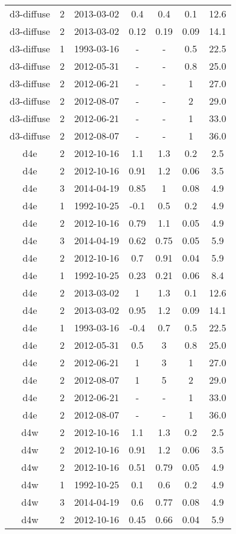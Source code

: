 \begin{longtable}{ccccccc}
d3-diffuse & 2 & 2013-03-02 & 0.4 & 0.4 & 0.1 & 12.6 \\
d3-diffuse & 2 & 2013-03-02 & 0.12 & 0.19 & 0.09 & 14.1 \\
d3-diffuse & 1 & 1993-03-16 & - & - & 0.5 & 22.5 \\
d3-diffuse & 2 & 2012-05-31 & - & - & 0.8 & 25.0 \\
d3-diffuse & 2 & 2012-06-21 & - & - & 1 & 27.0 \\
d3-diffuse & 2 & 2012-08-07 & - & - & 2 & 29.0 \\
d3-diffuse & 2 & 2012-06-21 & - & - & 1 & 33.0 \\
d3-diffuse & 2 & 2012-08-07 & - & - & 1 & 36.0 \\
d4e & 2 & 2012-10-16 & 1.1 & 1.3 & 0.2 & 2.5 \\
d4e & 2 & 2012-10-16 & 0.91 & 1.2 & 0.06 & 3.5 \\
d4e & 3 & 2014-04-19 & 0.85 & 1 & 0.08 & 4.9 \\
d4e & 1 & 1992-10-25 & -0.1 & 0.5 & 0.2 & 4.9 \\
d4e & 2 & 2012-10-16 & 0.79 & 1.1 & 0.05 & 4.9 \\
d4e & 3 & 2014-04-19 & 0.62 & 0.75 & 0.05 & 5.9 \\
d4e & 2 & 2012-10-16 & 0.7 & 0.91 & 0.04 & 5.9 \\
d4e & 1 & 1992-10-25 & 0.23 & 0.21 & 0.06 & 8.4 \\
d4e & 2 & 2013-03-02 & 1 & 1.3 & 0.1 & 12.6 \\
d4e & 2 & 2013-03-02 & 0.95 & 1.2 & 0.09 & 14.1 \\
d4e & 1 & 1993-03-16 & -0.4 & 0.7 & 0.5 & 22.5 \\
d4e & 2 & 2012-05-31 & 0.5 & 3 & 0.8 & 25.0 \\
d4e & 2 & 2012-06-21 & 1 & 3 & 1 & 27.0 \\
d4e & 2 & 2012-08-07 & 1 & 5 & 2 & 29.0 \\
d4e & 2 & 2012-06-21 & - & - & 1 & 33.0 \\
d4e & 2 & 2012-08-07 & - & - & 1 & 36.0 \\
d4w & 2 & 2012-10-16 & 1.1 & 1.3 & 0.2 & 2.5 \\
d4w & 2 & 2012-10-16 & 0.91 & 1.2 & 0.06 & 3.5 \\
d4w & 2 & 2012-10-16 & 0.51 & 0.79 & 0.05 & 4.9 \\
d4w & 1 & 1992-10-25 & 0.1 & 0.6 & 0.2 & 4.9 \\
d4w & 3 & 2014-04-19 & 0.6 & 0.77 & 0.08 & 4.9 \\
d4w & 2 & 2012-10-16 & 0.45 & 0.66 & 0.04 & 5.9 \\

\end{longtable}
